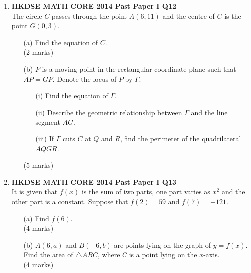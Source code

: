 \documentclass[12pt]{article}
\begin{document}
\begin{enumerate}
	\item \textbf{HKDSE MATH CORE 2014 Past Paper I Q12}\\
	The circle $C$ passes through the point $A(6, 11)$ and the centre of $C$ is the point $G(0, 3)$.
	\begin{enumerate}
		\item[(a)] Find the equation of $C$. \\(2 marks)
		\item[(b)] $P$ is a moving point in the rectangular coordinate plane such that $AP = GP$. Denote the locus of $P$ by $\Gamma$.
		\begin{enumerate}
			\item[(i)] Find the equation of $\Gamma$.
			\item[(ii)] Describe the geometric relationship between $\Gamma$ and the line segment $AG$.
			\item[(iii)] If $\Gamma$ cuts $C$ at $Q$ and $R$, find the perimeter of the quadrilateral $AQGR$.	
		\end{enumerate}
		(5 marks)
	\end{enumerate}

	\item \textbf{HKDSE MATH CORE 2014 Past Paper I Q13}\\
	It is given that $f(x)$ is the sum of two parts, one part varies as $x^2$ and the other part is a constant. Suppose that $f(2) = 59$ and $f(7) = -121$.
	\begin{enumerate}
		\item[(a)] Find $f(6)$. \\(4 marks)
		\item[(b)] $A(6, a)$ and $B(-6, b)$ are points lying on the graph of $y = f(x)$. Find the area of $\triangle ABC$, where $C$ is a point lying on the $x$-axis. \\(4 marks)
	\end{enumerate}


\end{enumerate}
\end{document}
